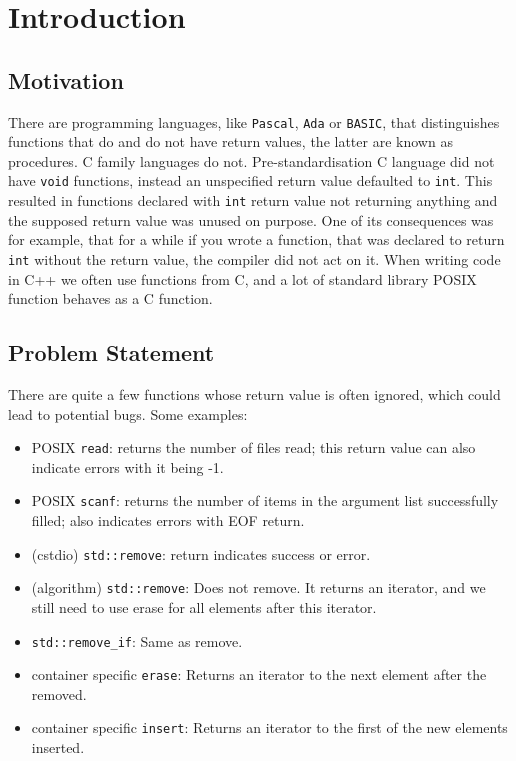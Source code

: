 \chapter{Introduction}
\label{ch:intro}

\section{Motivation}

There are programming languages, like \texttt{Pascal}, \texttt{Ada} or \texttt{BASIC}, that distinguishes functions that do and do not
have return values,
the latter are known as procedures. C family languages do not. Pre-standardisation C language did not have \lstinline{void} functions,
instead an unspecified return value defaulted to \lstinline{int}. This resulted in functions declared with \lstinline{int} return value
not returning anything and the supposed return value was unused on purpose. One of its consequences was for example, that for a while if
you wrote a function, that was declared to return \lstinline{int} without the return value, the compiler did not act on it. When writing
code in C++ we often use functions from C, and a lot of standard library POSIX function behaves as a C function. %

\section{Problem Statement}

There are quite a few functions whose return value is often ignored, which could lead to potential bugs. Some examples:

\begin{itemize}
	\item POSIX \texttt{read}: returns the number of files read; this return value can also indicate errors with it being -1.
	\item POSIX \texttt{scanf}: returns the number of items in the argument list successfully filled; also indicates errors with EOF return.
	\item (cstdio) \texttt{std::remove}: return indicates success or error.
	\item (algorithm) \texttt{std::remove}: Does not remove. It returns an iterator, and we still need to use erase for all elements after this iterator.
	\item \texttt{std::remove\_if}: Same as remove.
	\item container specific \texttt{erase}: Returns an iterator to the next element after the removed. 
	\item container specific \texttt{insert}: Returns an iterator to the first of the new elements inserted.
\end{itemize}

